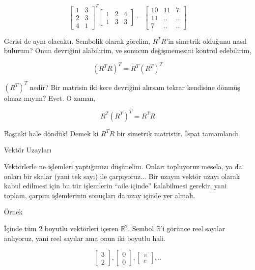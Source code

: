 \documentclass[12pt,fleqn]{article}\usepackage{../../common}
\begin{document}
$$ 
\left[\begin{array}{rr}
1 & 3 \\
2 & 3 \\
4 & 1 
\end{array}\right]^T
\left[\begin{array}{rrr}
1 & 2 & 4 \\
1 & 3 & 3 
\end{array}\right]
=
\left[\begin{array}{rrr}
10 & 11 & 7 \\
11 & .. & .. \\
7 & .. & ..
\end{array}\right]
 $$  

Gerisi de aynı olacaktı. Sembolik olarak görelim, $R^TR$'in simetrik
olduğunu nasıl bulurum? Onun devriğini alabilirim, ve sonucun değişmemesini
kontrol edebilirim,

$$ (R^TR)^T = R^T(R^T)^T $$

$(R^T)^T$ nedir? Bir matrisin iki kere devriğini alırsam tekrar kendisine
dönmüş olmaz mıyım? Evet. O zaman, 

$$  R^T(R^T)^T = R^T R $$

Baştaki hale döndük! Demek ki $R^TR$ bir simetrik matristir. İspat
tamamlandı. 

Vektör Uzayları

Vektörlerle ne işlemleri yaptığımızı düşünelim. Onları topluyoruz mesela,
ya da onları bir skalar (yani tek sayı) ile çarpıyoruz... Bir uzayın vektör
uzayı olarak kabul edilmesi için bu tür işlemlerin ``aile içinde''
kalabilmesi gerekir, yani toplam, çarpım işlemlerinin sonuçları da uzay
içinde yer almalı. 

Örnek

İçinde tüm 2 boyutlu vektörleri içeren $ \mathbb{R}^2 $. Sembol
$\mathbb{R}$'i görünce reel sayılar anlıyoruz, yani reel sayılar ama onun
iki boyutlu hali.

$$ 
\left[\begin{array}{r}
3 \\ 2 
\end{array}\right], 
\left[\begin{array}{r}
0 \\ 0
\end{array}\right], 
\left[\begin{array}{r}
\pi \\ e
\end{array}\right], 
..
 $$
\end{document}
